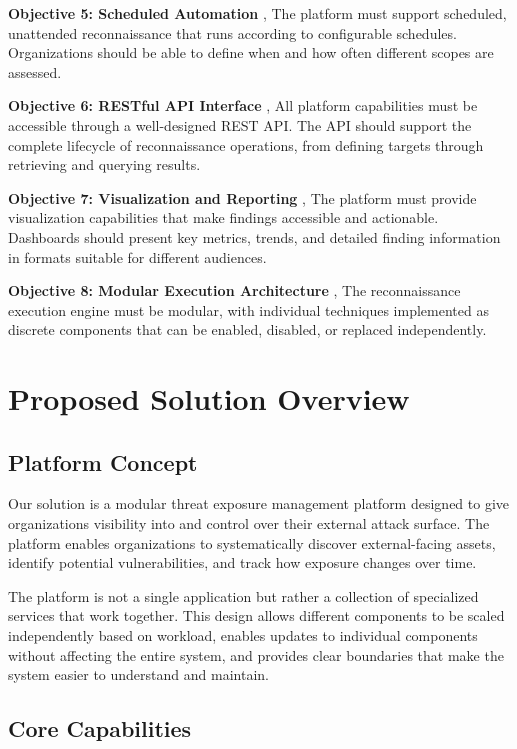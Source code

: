 \documentclass[a4paper,12pt]{report}
\begin{document}
\textbf{Objective 5: Scheduled Automation} ,  The platform must support scheduled, unattended reconnaissance that runs according to configurable schedules. Organizations should be able to define when and how often different scopes are assessed.\hfill \break

\textbf{Objective 6: RESTful API Interface} ,  All platform capabilities must be accessible through a well-designed REST API. The API should support the complete lifecycle of reconnaissance operations, from defining targets through retrieving and querying results.\hfill \break

\textbf{Objective 7: Visualization and Reporting} ,  The platform must provide visualization capabilities that make findings accessible and actionable. Dashboards should present key metrics, trends, and detailed finding information in formats suitable for different audiences.\hfill \break

\textbf{Objective 8: Modular Execution Architecture} ,  The reconnaissance execution engine must be modular, with individual techniques implemented as discrete components that can be enabled, disabled, or replaced independently.\hfill \break

\section{Proposed Solution Overview}

\subsection{Platform Concept}

Our solution is a modular threat exposure management platform designed to give organizations visibility into and control over their external attack surface. The platform enables organizations to systematically discover external-facing assets, identify potential vulnerabilities, and track how exposure changes over time.\hfill \break

The platform is not a single application but rather a collection of specialized services that work together. This design allows different components to be scaled independently based on workload, enables updates to individual components without affecting the entire system, and provides clear boundaries that make the system easier to understand and maintain.\hfill \break

\subsection{Core Capabilities}
\end{document}
